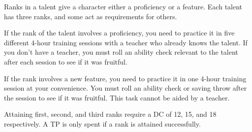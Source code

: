 Ranks in a talent give a character either a proficiency or a feature.
Each talent has three ranks, and some act as requirements for others.



If the rank of the talent involves a proficiency, you need to practice it in five different 4-hour training sessions with a teacher who already knows the talent.
If you don't have a teacher, you must roll an ability check relevant to the talent after each session to see if it was fruitful.

If the rank involves a new feature, you need to practice it in one 4-hour training session at your convenience.
You must roll an ability check or saving throw after the session to see if it was fruitful.
This task cannot be aided by a teacher.

Attaining first, second, and third ranks require a DC of 12, 15, and 18 respectively.
A TP is only spent if a rank is attained successfully.

